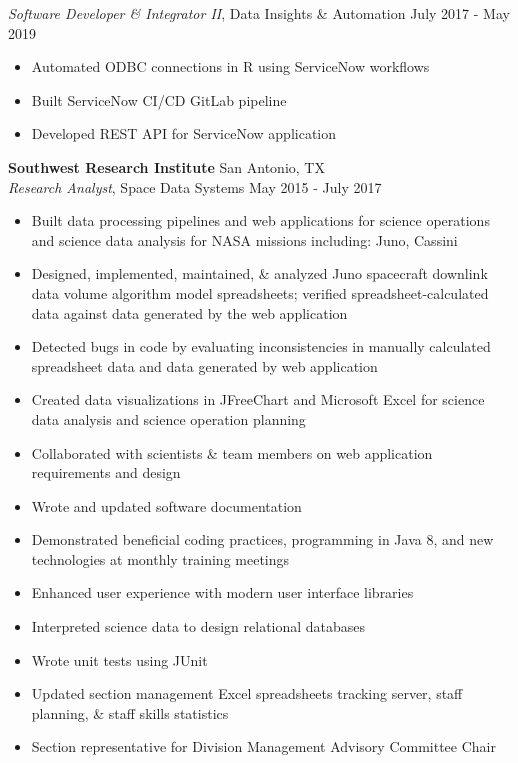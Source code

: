 \documentclass[a4paper]{article}
\begin{document}
\textit{Software Developer \& Integrator II}, Data Insights \& Automation \hfill July 2017 - May 2019\\
\vspace{-1mm}
\begin{itemize} \itemsep .5pt
	\item Automated ODBC connections in R using ServiceNow workflows
	\item Built ServiceNow CI/CD GitLab pipeline
	\item Developed REST API for ServiceNow application 
\end{itemize}
\textbf{Southwest Research Institute} \hfill San Antonio, TX\\
\textit{Research Analyst}, Space Data Systems \hfill May 2015 - July 2017\\
\vspace{-1mm}
\begin{itemize} \itemsep .5pt
	\item Built data processing pipelines and web applications for science operations and science data analysis for NASA missions including: Juno, Cassini
	\item Designed, implemented, maintained, \& analyzed Juno spacecraft downlink data volume algorithm model spreadsheets; verified spreadsheet-calculated data against data generated by the web application
	\item Detected bugs in code by evaluating inconsistencies in manually calculated spreadsheet data and data generated by web application
	\item Created data visualizations in JFreeChart and Microsoft Excel for science data analysis and science operation planning
	\item Collaborated with scientists \& team members on web application requirements and design
	\item Wrote and updated software documentation
	\item Demonstrated beneficial coding practices, programming in Java 8, and new technologies at monthly training meetings
	\item Enhanced user experience with modern user interface libraries
	\item Interpreted science data to design relational databases
	\item Wrote unit tests using JUnit
	\item Updated section management Excel spreadsheets tracking server, staff planning, \& staff skills statistics
	\item Section representative for Division Management Advisory Committee Chair 
\end{itemize}
\end{document}
